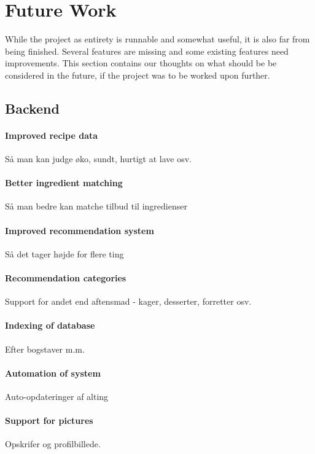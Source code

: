 \section{Future Work}
\label{sec:future}

While the project as entirety is runnable and somewhat useful, it is also far from being finished. Several features are missing and some existing features need improvements. This section contains our thoughts on what should be be considered in the future, if the project was to be worked upon further.

\subsection{Backend}

\paragraph{Improved recipe data}
Så man kan judge øko, sundt, hurtigt at lave osv.

\paragraph{Better ingredient matching}
Så man bedre kan matche tilbud til ingredienser

\paragraph{Improved recommendation system}
Så det tager højde for flere ting

\paragraph{Recommendation categories}
Support for andet end aftensmad - kager, desserter, forretter osv.

\paragraph{Indexing of database}
Efter bogstaver m.m.

\paragraph{Automation of system}
Auto-opdateringer af alting

\paragraph{Support for pictures}
Opskrifer og profilbillede.

